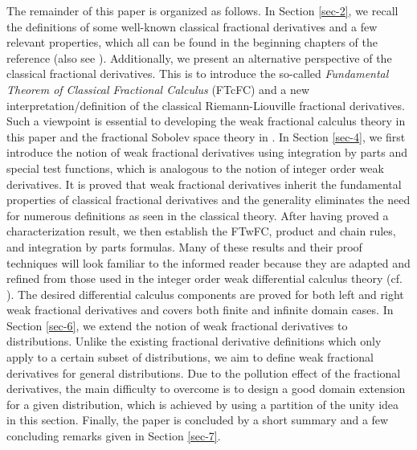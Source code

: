 \documentclass[leqno,final]{siamltex}
\numberwithin{equation}{section}
\renewcommand{\(}{\bigl(}
\renewcommand{\)}{\bigr)}
\begin{document}
    The remainder of this paper is organized as follows. In Section \ref{sec-2},  we recall the definitions of some well-known classical fractional derivatives and a few relevant 
    properties, which all can be found in the beginning chapters of the reference \cite{Samko}
    (also see \cite[Section 2]{Feng_Sutton}). Additionally, we present an alternative perspective of the classical fractional derivatives. This is to introduce the so-called {\em Fundamental Theorem of Classical Fractional Calculus} (FTcFC) and a new interpretation/definition of 
    the classical
    Riemann-Liouville fractional derivatives. Such a viewpoint is essential to developing the 
    weak fractional calculus theory in this paper and the fractional Sobolev space theory in \cite{Feng_Sutton1a}.
    In Section \ref{sec-4}, we first introduce the notion of weak fractional derivatives using integration by parts and special test functions, which is analogous to the notion of integer order weak derivatives. It is proved that weak fractional derivatives inherit the fundamental properties of classical fractional derivatives and the generality eliminates the need for numerous definitions as seen in the classical theory. After having proved a characterization result, we then establish the FTwFC, product and chain rules, and integration by parts formulas. Many of these results and their proof techniques will look familiar to the informed reader because they are adapted and refined  from those used in the integer order weak differential calculus theory (cf. \cite{Adams, Evans, Meyers}). The desired differential calculus components are proved for both left and right weak fractional derivatives and covers both finite and infinite domain cases. 
    In Section \ref{sec-6}, we extend the notion of weak fractional derivatives to distributions. Unlike the existing fractional derivative definitions which only apply to a certain subset of distributions, we aim to define weak fractional derivatives for general distributions.
    Due to the pollution effect of the fractional derivatives, the main difficulty to overcome 
    is to design a good domain extension for a given distribution, which is achieved by using 
    a partition of the unity idea in this section. 
%
    Finally, the paper is concluded by a short summary and a few concluding remarks given in Section \ref{sec-7}.
 
 
\end{document}
